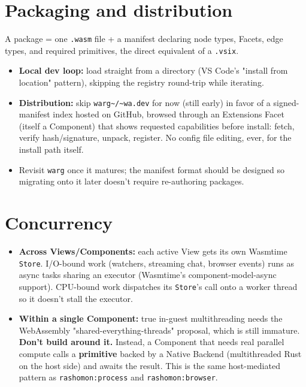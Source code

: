 \documentclass[11pt]{article}
\begin{document}
\section{Packaging and distribution}
\label{sec:org498caaf}

A package = one \texttt{.wasm} file + a manifest declaring node types, Facets, edge types, and required primitives, the direct equivalent of a \texttt{.vsix}.

\begin{itemize}
\item \textbf{Local dev loop:} load straight from a directory (VS Code's "install from location" pattern), skipping the registry round-trip while iterating.
\item \textbf{Distribution:} skip \texttt{warg\textasciitilde{}/\textasciitilde{}wa.dev} for now (still early) in favor of a signed-manifest index hosted on GitHub, browsed through an Extensions Facet (itself a Component) that shows requested capabilities before install: fetch, verify hash/signature, unpack, register. No config file editing, ever, for the install path itself.
\item Revisit \texttt{warg} once it matures; the manifest format should be designed so migrating onto it later doesn't require re-authoring packages.
\end{itemize}
\section{Concurrency}
\label{sec:org43962ea}

\begin{itemize}
\item \textbf{Across Views/Components:} each active View gets its own Wasmtime \texttt{Store}. I/O-bound work (watchers, streaming chat, browser events) runs as async tasks sharing an executor (Wasmtime's component-model-async support). CPU-bound work dispatches its \texttt{Store}'s call onto a worker thread so it doesn't stall the executor.
\item \textbf{Within a single Component:} true in-guest multithreading needs the WebAssembly "shared-everything-threads" proposal, which is still immature. \textbf{Don't build around it.} Instead, a Component that needs real parallel compute calls a \textbf{primitive} backed by a Native Backend (multithreaded Rust on the host side) and awaits the result. This is the same host-mediated pattern as \texttt{rashomon:process} and \texttt{rashomon:browser}.
\end{itemize}
\end{document}
